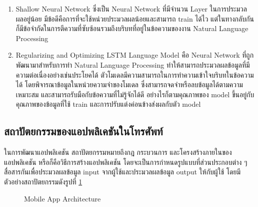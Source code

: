 \documentclass[14pt,oneside,openright,a4paper]{cpe-thai-project}
\begin{document}
    \begin{enumerate}
      \item Shallow Neural Network ซึ่งเป็น Neural Network ที่มีจำนวน Layer ในการประมวลผลอยู่น้อย มีข้อดีคือการที่จะใช้หน่วยประมวลผลน้อยและสามารถ train ได้ไว แต่ในทางกลับกันก็มีข้อจำกัดในการตีความที่ซับซ้อนรวมถึงบริบทที่อยู่ในข้อความของงาน Natural Language Processing
      \item Regularizing and Optimizing LSTM Language Model \cite{LSTM} คือ Neural Network ที่ถูกพัฒนามาสำหรับการทำ Natural Language Processing ทำให้สามารถประมวลผลข้อมูลที่มีความต่อเนื่องอย่างเช่นประโยคได้ ตัวโมเดลมีความสามารถในการทำความเข้าใจบริบทในข้อความได้ โดยพิจารณาข้อมูลในหน่วยความจำของโมเดล ซึ่งสามารถจดจำหรือลบข้อมูลได้ตามความเหมาะสม และสามารถรับมือกับข้อความที่ไม่รู้จักได้ดี อย่างไรก็ตามคุณภาพของ model ขึ้นอยู่กับคุณภาพของข้อมูลที่ใช้ train และการปรับแต่งค่อนข้างส่งผลกับตัว model
    \end{enumerate}
   
   \newpage
   \subsection { สถาปัตยกรรมของแอปพลิเคชันในโทรศัพท์ \cite{MobileAppArchitecture}} 
   ในการพัฒนาแอปพลิเคชัน สถาปัตยกรรมหมายถึงกฎ กระบวนการ และโครงสร้างภายในของแอปพลิเคชัน หรือก็คือวิธีการสร้างแอปพลิเคชัน โดยจะเป็นการกำหนดรูปแบบที่ส่วนประกอบต่าง ๆ สื่อสารกันเพื่อประมวลผลข้อมูล input จากผู้ใช้และประมวลผลข้อมูล output ให้กับผู้ใช้ โดยมีตัวอย่างสถาปัตยกรรมดังรูปที่ \ref{fig:mobile_arc1}

    \begin{figure}[!h]\centering
      \setlength{\fboxrule}{0.5mm} %
      \setlength{\fboxsep}{0.5cm}
      \caption{Mobile App Architecture \cite{MobileAppArchitectureOverview}}\label{fig:mobile_arc1}
    \end{figure}
\end{document}
